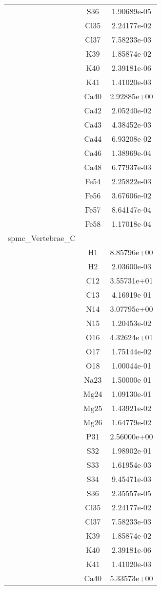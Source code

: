 \begin{centering}
\begin{longtable}{l c c}
& S36 & 1.90689e-05 \\ 
& Cl35 & 2.24177e-02 \\ 
& Cl37 & 7.58233e-03 \\ 
& K39 & 1.85874e-02 \\ 
& K40 & 2.39181e-06 \\ 
& K41 & 1.41020e-03 \\ 
& Ca40 & 2.92885e+00 \\ 
& Ca42 & 2.05240e-02 \\ 
& Ca43 & 4.38452e-03 \\ 
& Ca44 & 6.93208e-02 \\ 
& Ca46 & 1.38969e-04 \\ 
& Ca48 & 6.77937e-03 \\ 
& Fe54 & 2.25822e-03 \\ 
& Fe56 & 3.67606e-02 \\ 
& Fe57 & 8.64147e-04 \\ 
& Fe58 & 1.17018e-04 \\ 
\hline
spmc\_Vertebrae\_C & & \\
\hline
& H1 & 8.85796e+00 \\ 
& H2 & 2.03600e-03 \\ 
& C12 & 3.55731e+01 \\ 
& C13 & 4.16919e-01 \\ 
& N14 & 3.07795e+00 \\ 
& N15 & 1.20453e-02 \\ 
& O16 & 4.32624e+01 \\ 
& O17 & 1.75144e-02 \\ 
& O18 & 1.00044e-01 \\ 
& Na23 & 1.50000e-01 \\ 
& Mg24 & 1.09130e-01 \\ 
& Mg25 & 1.43921e-02 \\ 
& Mg26 & 1.64779e-02 \\ 
& P31 & 2.56000e+00 \\ 
& S32 & 1.98902e-01 \\ 
& S33 & 1.61954e-03 \\ 
& S34 & 9.45471e-03 \\ 
& S36 & 2.35557e-05 \\ 
& Cl35 & 2.24177e-02 \\ 
& Cl37 & 7.58233e-03 \\ 
& K39 & 1.85874e-02 \\ 
& K40 & 2.39181e-06 \\ 
& K41 & 1.41020e-03 \\ 
& Ca40 & 5.33573e+00 \\ 

\end{longtable}
\end{centering}
